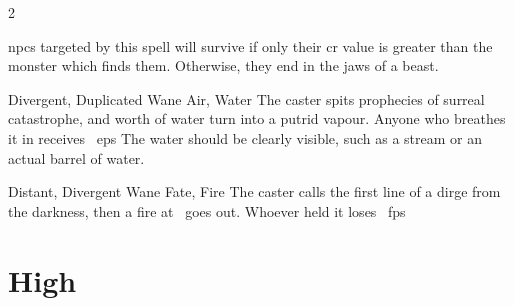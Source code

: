 \begin{multicols}{2}
{{      \Glspl{npc} targeted by this spell will survive if only their \gls{cr} value is greater than the \gls{monster} which finds them.
      Otherwise, they end in the jaws of a beast.
    }

}

  {Divergent, Duplicated}%
  {Wane}%
  {Air, Water}%
  {}%
  {The caster spits prophecies of surreal catastrophe, and  worth of water turn into a putrid vapour.
  Anyone who breathes it in receives ~\glspl{ep}}%
  {
    The water should be clearly visible, such as a stream or an actual barrel of water.}

  {Distant, Divergent}%
  {Wane}%
  {Fate, Fire}%
  {}%
  {The caster calls the first line of a dirge from the darkness, then a fire at \spellRange\ goes out.
  Whoever held it loses \showDam~\glspl{fp}}%
  {}




\end{multicols}

\section{High }

